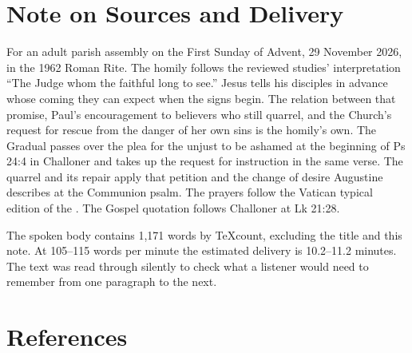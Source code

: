 \section{Note on Sources and Delivery}

For an adult parish assembly on the First Sunday of Advent, 29 November 2026, in the 1962 Roman Rite. The homily follows the reviewed studies' interpretation “The Judge whom the faithful long to see.” Jesus tells his disciples in advance whose coming they can expect when the signs begin. The relation between that promise, Paul's encouragement to believers who still quarrel, and the Church's request for rescue from the danger of her own sins is the homily's own. The Gradual passes over the plea for the unjust to be ashamed at the beginning of Ps 24:4 in Challoner and takes up the request for instruction in the same verse. The quarrel and its repair apply that petition and the change of desire Augustine describes at the Communion psalm. The prayers follow the Vatican typical edition of the . The Gospel quotation follows Challoner at Lk 21:28.

The spoken body contains 1,171 words by TeXcount, excluding the title and this note. At 105--115 words per minute the estimated delivery is 10.2--11.2 minutes. The text was read through silently to check what a listener would need to remember from one paragraph to the next.

\section{References}

